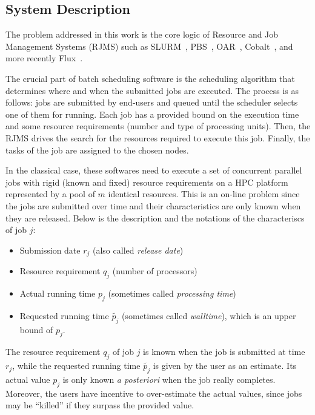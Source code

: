 \documentclass[sigconf]{acmart}
\begin{document}
\subsection{System Description}
\label{sub:sysdesc}

The problem addressed in this work is the core logic of Resource and Job
Management Systems (RJMS) such as SLURM~\cite{SLURMdocSCHED}, PBS~\cite{PBSdoc},
OAR~\cite{capit2005batch}, Cobalt~\cite{Cobalt}, and more recently Flux~\cite{flux2014}.

The crucial part of batch scheduling software is the scheduling algorithm that determines
where and when the submitted jobs are executed. The process is as follows: jobs
are submitted by end-users and queued until the scheduler selects one of them
for running. Each job has a provided bound on the execution time and some
resource requirements (number and type of processing units). Then, the RJMS
drives the search for the resources required to execute this job. Finally, the
tasks of the job are assigned to the chosen nodes.

In the classical case, these softwares need to execute a set of concurrent
parallel jobs with rigid (known and fixed) resource requirements on a HPC
platform represented by a pool of $m$ identical resources. This is an on-line
problem since the jobs are submitted over time and their characteristics are only known when they are released.
Below is the description and the notations of the characteriscs of job $j$:

\begin{itemize}
  \item Submission date $r_j$ (also called \textit{release date})

  \item Resource requirement $q_j$ (number of processors)

  \item Actual running time $p_j$ (sometimes called \textit{processing time})

  \item Requested running time $\widetilde{p_j}$ (sometimes called \textit{walltime}), which is an upper bound of $p_j$.

\end{itemize}

The resource requirement $q_j$ of job $j$ is known when the job is submitted at
time $r_j$, while the requested running time $\widetilde{p_j}$ is given by the
user as an estimate. Its actual value $p_j$ is only known \textit{a posteriori}
when the job really completes.  Moreover, the users have incentive to
over-estimate the actual values, since jobs may be ``killed'' if they
surpass the provided value.
\end{document}

